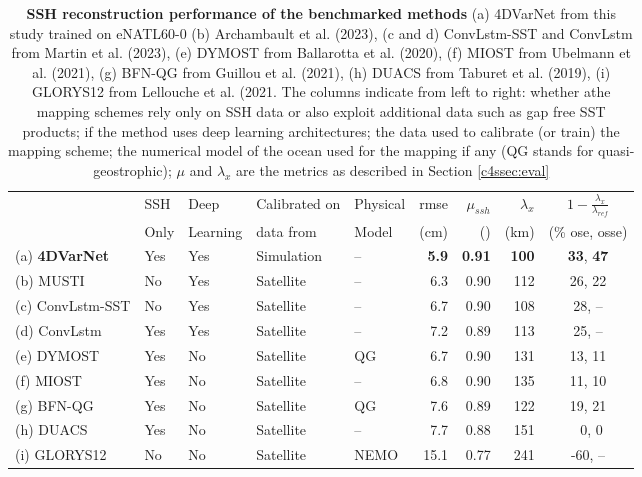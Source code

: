 \begin{bibunit}
\begin{table}[h]
\hspace{-10mm}\begin{tabular}{l||llll|rrrc}
\toprule
 & SSH  & Deep  & Calibrated on  & Physical  & rmse & $\mu_{ssh}$  & $\lambda_x$ & $1 - \frac{\lambda_x}{\lambda_{ref}}$ \\
 &  Only &  Learning &  data from &  Model &  (cm) &  () &  (km) & (\% ose, osse) \\
\midrule
(a) \textbf{4DVarNet} &  Yes & Yes & Simulation  & -- & \textbf{5.9}  & \textbf{0.91}  & \textbf{100} & \textbf{33}, \textbf{47} \\
(b) MUSTI & No &  Yes & Satellite  & -- & 6.3  & 0.90  & 112 & 26, 22 \\
(c) ConvLstm-SST & No &  Yes & Satellite  & -- & 6.7  & 0.90  & 108 & 28, -- \\
(d) ConvLstm &  Yes &  Yes & Satellite  & -- & 7.2  & 0.89  & 113 & 25, -- \\
(e) DYMOST&  Yes & No & Satellite  & QG & 6.7  & 0.90  & 131 & 13, 11 \\
(f) MIOST &  Yes & No & Satellite  & -- & 6.8  & 0.90  & 135 & 11, 10 \\
(g) BFN-QG &  Yes & No & Satellite  & QG & 7.6  & 0.89  & 122 & 19, 21 \\
(h) DUACS &  Yes & No & Satellite  & -- & 7.7  & 0.88  & 151 &  ~0,  0 \\
(i) GLORYS12 & No & No & Satellite  & NEMO & 15.1  & 0.77  & 241 & -60, -- \\
\bottomrule
\end{tabular}
\caption{ \textbf{SSH reconstruction performance of the benchmarked methods} (a) 4DVarNet from this study trained on eNATL60-0 (b) Archambault et al. (2023), (c and d)
ConvLstm-SST and ConvLstm from Martin et al. (2023), (e) DYMOST from Ballarotta
et al. (2020), (f) MIOST from Ubelmann et al. (2021), (g) BFN-QG from Guillou et
al. (2021), (h) DUACS from Taburet et al. (2019), (i) GLORYS12 from Lellouche et al.
(2021. The columns indicate from left to right: whether athe mapping schemes rely only on SSH data or also exploit additional data such as gap free SST products; if the method uses deep learning architectures; the data used to calibrate (or train) the mapping scheme; the numerical model of the ocean used for the mapping if any (QG stands for quasi-geostrophic); $\mu$ and $\lambda_x$ are the metrics as described in Section \ref{c4ssec:eval}}
\label{c4tab:bench}
\end{table}




\end{bibunit}
